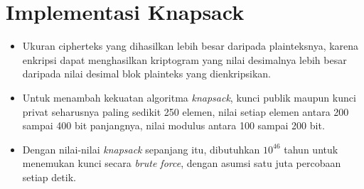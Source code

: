 \documentclass{article}
\begin{document}

\section*{Implementasi Knapsack}

\begin{itemize}
    \item Ukuran cipherteks yang dihasilkan lebih besar daripada plainteksnya, karena enkripsi dapat menghasilkan kriptogram yang nilai desimalnya lebih besar daripada nilai desimal blok plainteks yang dienkripsikan.
    \item Untuk menambah kekuatan algoritma \textit{knapsack}, kunci publik maupun kunci privat seharusnya paling sedikit 250 elemen, nilai setiap elemen antara 200 sampai 400 bit panjangnya, nilai modulus antara 100 sampai 200 bit.
    \item Dengan nilai-nilai \textit{knapsack} sepanjang itu, dibutuhkan $10^{46}$ tahun untuk menemukan kunci secara \textit{brute force}, dengan asumsi satu juta percobaan setiap detik.
\end{itemize}
\end{document}
